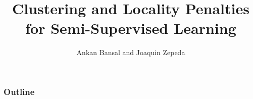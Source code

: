\documentclass{beamer}
\title{Clustering and Locality Penalties for Semi-Supervised Learning}
\author{Ankan Bansal and Joaquin Zepeda}
\date{}
\begin{document}
\maketitle

\begin{frame}
	\frametitle{Outline}
	\tableofcontents
\end{frame}





\end{document}
